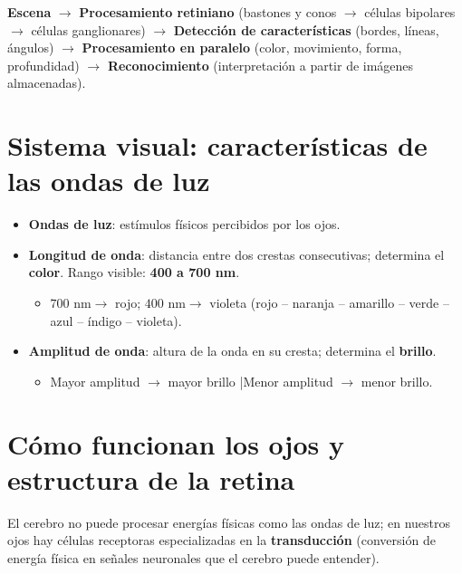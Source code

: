 \documentclass[11pt,a4paper]{article}
\begin{document}
\begin{cajaClave}[title={Flujo del procesamiento visual}]
\centering
\textbf{Escena} $\rightarrow$ \textbf{Procesamiento retiniano} (bastones y conos $\rightarrow$ células bipolares $\rightarrow$ células ganglionares) $\rightarrow$ \textbf{Detección de características} (bordes, líneas, ángulos) $\rightarrow$ \textbf{Procesamiento en paralelo} (color, movimiento, forma, profundidad) $\rightarrow$ \textbf{Reconocimiento} (interpretación a partir de imágenes almacenadas).
\end{cajaClave}

\section{Sistema visual: características de las ondas de luz}

\begin{itemize}
  \item \textbf{Ondas de luz}: estímulos físicos percibidos por los ojos.
  \item \textbf{Longitud de onda}: distancia entre dos crestas consecutivas; determina el \textbf{color}. Rango visible: \textbf{400 a 700 nm}.
  \begin{itemize}
    \item $700\text{ nm} \rightarrow$ rojo; $400\text{ nm} \rightarrow$ violeta (rojo -- naranja -- amarillo -- verde -- azul -- índigo -- violeta).
  \end{itemize}
  \item \textbf{Amplitud de onda}: altura de la onda en su cresta; determina el \textbf{brillo}.
  \begin{itemize}
    \item Mayor amplitud $\rightarrow$ mayor brillo \quad|\quad Menor amplitud $\rightarrow$ menor brillo.
  \end{itemize}
\end{itemize}

\section{Cómo funcionan los ojos y estructura de la retina}

El cerebro no puede procesar energías físicas como las ondas de luz; en nuestros ojos hay células receptoras especializadas en la \textbf{transducción} (conversión de energía física en señales neuronales que el cerebro puede entender).
\end{document}
